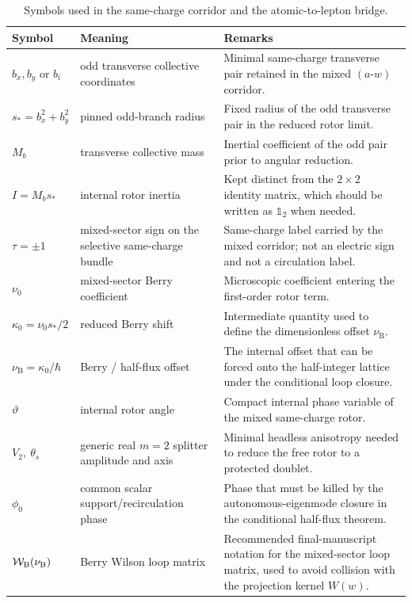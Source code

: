 \documentclass[11pt]{article}
\theoremstyle{plain}
\theoremstyle{definition}
\theoremstyle{remark}
\newcommand{\nuB}{\nu_{\mathrm{B}}}
\newcommand{\throt}{\vartheta}
\begin{document}
\begin{table}[t]
\centering
\caption{Symbols used in the same-charge corridor and the atomic-to-lepton bridge.}
\label{tab:notation-ledger-corridor}
\begin{tabularx}{\textwidth}{@{}>{\raggedright\arraybackslash}p{} >{\raggedright\arraybackslash}p{} X@{}}
\toprule
Symbol & Meaning & Remarks \\
\midrule
$b_x,b_y$ or $b_i$ & odd transverse collective coordinates & Minimal same-charge transverse pair retained in the mixed $(a\text{-}w)$ corridor. \\
$s_*=b_x^2+b_y^2$ & pinned odd-branch radius & Fixed radius of the odd transverse pair in the reduced rotor limit. \\
$M_b$ & transverse collective mass & Inertial coefficient of the odd pair prior to angular reduction. \\
$I=M_b s_*$ & internal rotor inertia & Kept distinct from the $2\times 2$ identity matrix, which should be written as $\mathbb{1}_2$ when needed. \\
$\tau=\pm1$ & mixed-sector sign on the selective same-charge bundle & Same-charge label carried by the mixed corridor; not an electric sign and not a circulation label. \\
$\nu_0$ & mixed-sector Berry coefficient & Microscopic coefficient entering the first-order rotor term. \\
$\kappa_0=\nu_0 s_*/2$ & reduced Berry shift & Intermediate quantity used to define the dimensionless offset $\nuB$. \\
$\nuB=\kappa_0/\hbar$ & Berry / half-flux offset & The internal offset that can be forced onto the half-integer lattice under the conditional loop closure. \\
$\throt$ & internal rotor angle & Compact internal phase variable of the mixed same-charge rotor. \\
$V_2,\ \theta_s$ & generic real $m=2$ splitter amplitude and axis & Minimal headless anisotropy needed to reduce the free rotor to a protected doublet. \\
$\phi_0$ & common scalar support/recirculation phase & Phase that must be killed by the autonomous-eigenmode closure in the conditional half-flux theorem. \\
$\mathcal W_{\rm B}(\nuB)$ & Berry Wilson loop matrix & Recommended final-manuscript notation for the mixed-sector loop matrix, used to avoid collision with the projection kernel $W(w)$. \\

\end{tabularx}
\end{table}
\end{document}
